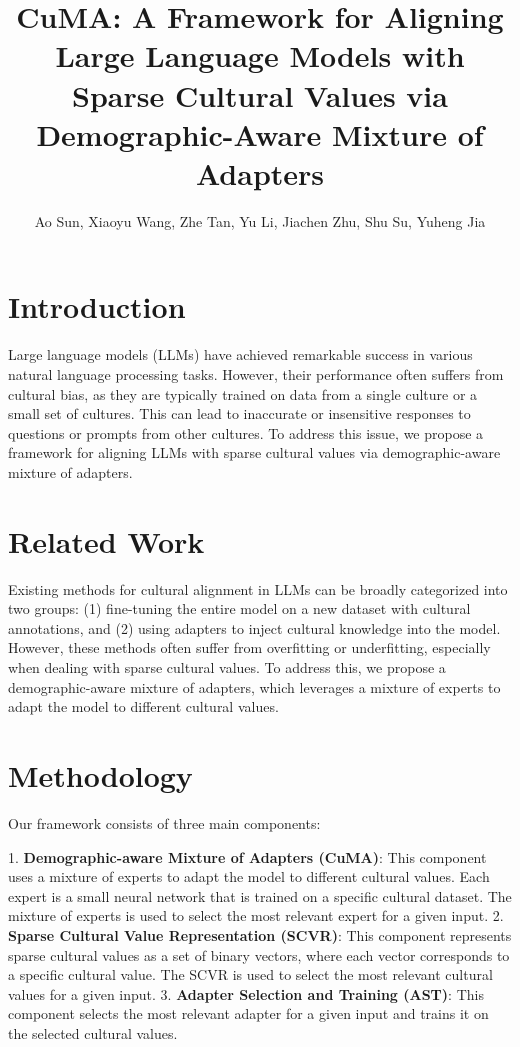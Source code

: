 \documentclass{article}
\begin{document}
\title{CuMA: A Framework for Aligning Large Language Models with Sparse Cultural Values via Demographic-Aware Mixture of Adapters}

\author{Ao Sun, Xiaoyu Wang, Zhe Tan, Yu Li, Jiachen Zhu, Shu Su, Yuheng Jia}

\maketitle

\section{Introduction}

Large language models (LLMs) have achieved remarkable success in various natural language processing tasks. However, their performance often suffers from cultural bias, as they are typically trained on data from a single culture or a small set of cultures. This can lead to inaccurate or insensitive responses to questions or prompts from other cultures. To address this issue, we propose a framework for aligning LLMs with sparse cultural values via demographic-aware mixture of adapters.

\section{Related Work}

Existing methods for cultural alignment in LLMs can be broadly categorized into two groups: (1) fine-tuning the entire model on a new dataset with cultural annotations, and (2) using adapters to inject cultural knowledge into the model. However, these methods often suffer from overfitting or underfitting, especially when dealing with sparse cultural values. To address this, we propose a demographic-aware mixture of adapters, which leverages a mixture of experts to adapt the model to different cultural values.

\section{Methodology}

Our framework consists of three main components:

1. \textbf{Demographic-aware Mixture of Adapters (CuMA)}: This component uses a mixture of experts to adapt the model to different cultural values. Each expert is a small neural network that is trained on a specific cultural dataset. The mixture of experts is used to select the most relevant expert for a given input.
2. \textbf{Sparse Cultural Value Representation (SCVR)}: This component represents sparse cultural values as a set of binary vectors, where each vector corresponds to a specific cultural value. The SCVR is used to select the most relevant cultural values for a given input.
3. \textbf{Adapter Selection and Training (AST)}: This component selects the most relevant adapter for a given input and trains it on the selected cultural values.
\end{document}
